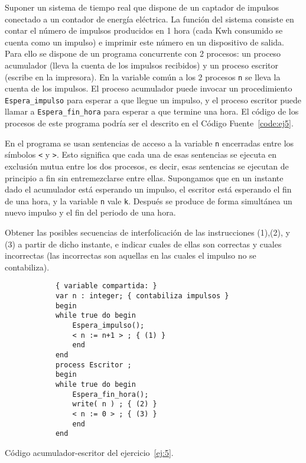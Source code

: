 \begin{ejercicio} \label{ej:5}
    Suponer un sistema de tiempo real que dispone de un captador de impulsos conectado a un
    contador de energía eléctrica. La función del sistema consiste en contar el número de impulsos
    producidos en 1 hora (cada Kwh consumido se cuenta como un impulso) e imprimir este número
    en un dispositivo de salida. Para ello se dispone de un programa concurrente con 2 procesos: un
    proceso acumulador (lleva la cuenta de los impulsos recibidos) y un proceso escritor (escribe
    en la impresora). En la variable común a los 2 procesos \verb|n| se lleva la cuenta de los impulsos. El
    proceso acumulador puede invocar un procedimiento \verb|Espera_impulso| para esperar a que llegue
    un impulso, y el proceso escritor puede llamar a \verb|Espera_fin_hora| para esperar a que termine
    una hora. El código de los procesos de este programa podría ser el descrito en el Código Fuente~\ref{code:ej5}.
    \begin{observacion}
        En el programa se usan sentencias de acceso a la variable \verb|n| encerradas entre los símbolos \verb|<| y
        \verb|>|. Esto significa que cada una de esas sentencias se ejecuta en exclusión mutua entre los dos
        procesos, es decir, esas sentencias se ejecutan de principio a fin sin entremezclarse entre ellas.
        Supongamos que en un instante dado el acumulador está esperando un impulso, el escritor está
        esperando el fin de una hora, y la variable \verb|n| vale \verb|k|. Después se produce de forma simultánea
        un nuevo impulso y el fin del periodo de una hora.
    \end{observacion}

    Obtener las posibles secuencias de interfolicación de las instrucciones (1),(2), y (3) a partir de
    dicho instante, e indicar cuales de ellas son correctas y cuales incorrectas (las incorrectas son
    aquellas en las cuales el impulso no se contabiliza).
    \begin{listing}
        \begin{verbatim}
            { variable compartida: }
            var n : integer; { contabiliza impulsos }
            begin
            while true do begin
                Espera_impulso();
                < n := n+1 > ; { (1) }
                end
            end
            process Escritor ;
            begin
            while true do begin
                Espera_fin_hora();
                write( n ) ; { (2) }
                < n := 0 > ; { (3) }
                end
            end
        \end{verbatim}
        \caption{Código acumulador-escritor del ejercicio~\ref{ej:5}.}
        \label{code:ej5}
    \end{listing}
\end{ejercicio}



